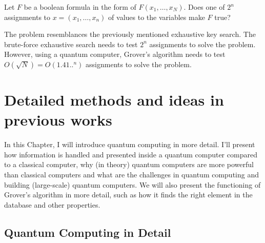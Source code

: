 \documentclass[english,oneside,openright]{UH_DS_report}
\begin{document}
Let $F$ be a boolean formula in the form of $F(x_{1}, \ldots, x_{N})$. Does one of $2^{n}$ assignments to $x = (x_{1}, \ldots, x_{n})$ of values to the variables make $F$ true?

The problem resemblances the previously mentioned exhaustive key search. The brute-force exhaustive search needs to test $2^{n}$ assignments to solve the problem. However, using a quantum computer, Grover's algorithm needs to test $O(\sqrt{N}) = O(1.41..^{n})$ assignments to solve the problem.

\chapter{Detailed methods and ideas in previous works}
\label{chapter:previouswork}

In this Chapter, I will introduce quantum computing in more detail. I'll present how information is handled and presented inside a quantum computer compared to a classical computer, why (in theory) quantum computers are more powerful than classical computers and what are the challenges in quantum computing and building (large-scale) quantum computers. We will also present the functioning of Grover's algorithm in more detail, such as how it finds the right element in the database and other properties.

\section{Quantum Computing in Detail}
\end{document}
